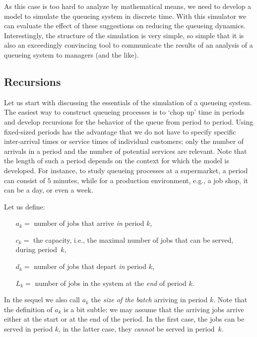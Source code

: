 As this case is too hard to analyze by mathematical means, we need to develop a model to simulate the queueing system in discrete time. 
With this simulator we can evaluate the effect of these suggestions on reducing the queueing dynamics.
Interestingly, the structure of the simulation is very simple, so simple that it is also an exceedingly convincing tool to communicate the results of an analysis of a queueing system to managers (and the like).

\subsection*{Recursions}

Let us start with discussing the essentials of the simulation of a queueing system.
The easiest way to construct queueing processes is to `chop up' time in periods and develop recursions for the behavior of the queue from period to period.
Using fixed-sized periods has the advantage that we do not have to specify specific inter-arrival times or service times of individual customers; only the number of arrivals in a period and the number of potential services are relevant.
Note that the length of such a period depends on the context for which the model is developed.
For instance, to study queueing processes at a supermarket, a period can consist of $5$ minutes, while for a production environment, e.g., a job shop, it can be a day, or even a week.


Let us define:
\begin{itemize}
 \item[$a_k =$] number of jobs that arrive \textit{in} period $k$,
 \item[$c_k= $] the capacity, i.e., the maximal number of jobs that can be served, during period~$k$,
 \item[$d_k =$] number of jobs that depart \textit{in} period $k$,
 \item[$L_k =$] number of jobs in the system at the \textit{end} of period $k$.
\end{itemize}
In the sequel we also call $a_k$ the \emph{size of the batch} arriving in period $k$.
Note that the definition of $a_k$ is a bit subtle: we may assume that the arriving jobs arrive either at the start or at the end of the period.
In the first case, the jobs can be served in period $k$, in the latter case, they \emph{cannot} be served in period~$k$.


